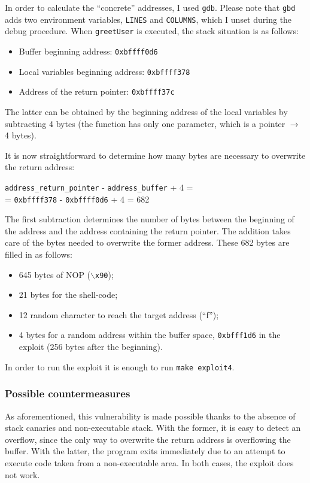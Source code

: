 In order to calculate the ``concrete'' addresses, I used \texttt{gdb}. Please note that \texttt{gbd} adds two environment variables, \texttt{LINES} and \texttt{COLUMNS}, which I unset during the debug procedure. When \texttt{greetUser} is executed, the stack situation is as follows:
\begin{itemize}
	\item Buffer beginning address: \texttt{0xbffff0d6}
	\item Local variables beginning address: \texttt{0xbffff378}
	\item Address of the return pointer: \texttt{0xbffff37c}
\end{itemize}
The latter can be obtained by the beginning address of the local variables by subtracting 4 bytes (the function has only one parameter, which is a pointer $\rightarrow$ 4 bytes).

It is now straightforward to determine how many bytes are necessary to overwrite the return address:

\begin{center}
	\texttt{address\_return\_pointer} - \texttt{address\_buffer} + 4 =\\
	= \texttt{0xbffff378} - \texttt{0xbffff0d6} + 4 = 682
\end{center}

The first subtraction determines the number of bytes between the beginning of the address and the address containing the return pointer. The addition takes care of the bytes needed to overwrite the former address. These 682 bytes are filled in as follows:
\begin{itemize}
	\item 645 bytes of NOP (\texttt{$\backslash$x90});
	\item 21 bytes for the shell-code;
	\item 12 random character to reach the target address (``f'');
	\item 4 bytes for a random address within the buffer space, \texttt{0xbfff1d6} in the exploit (256 bytes after the beginning).
\end{itemize}

In order to run the exploit it is enough to run \texttt{make exploit4}.

\subsubsection{Possible countermeasures}
As aforementioned, this vulnerability is made possible thanks to the absence of stack canaries and non-executable stack. With the former, it is easy to detect an overflow, since the only way to overwrite the return address is overflowing the buffer. With the latter, the program exits immediately due to an attempt to execute code taken from a non-executable area. In both cases, the exploit does not work. 

